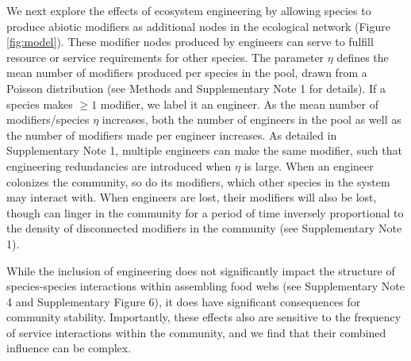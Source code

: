 \documentclass[twocolumn,preprintnumbers,amsmath,amssymb,superscriptaddress,linenumbers]{revtex4-1}
\begin{document}
We next explore the effects of ecosystem engineering by allowing species to produce abiotic modifiers as additional nodes in the ecological network (Figure \ref{fig:model}).
These modifier nodes produced by engineers can serve to fulfill resource or service requirements for other species.
The parameter $\eta$ defines the mean number of modifiers produced per species in the pool, drawn from a Poisson distribution (see Methods and Supplementary Note 1 for details).
If a species makes $\geq 1$ modifier, we label it an engineer.
As the mean number of modifiers/species $\eta$ increases, both the number of engineers in the pool as well as the number of modifiers made per engineer increases.
As detailed in Supplementary Note 1, multiple engineers can make the same modifier, such that engineering redundancies are introduced when $\eta$ is large.
When an engineer colonizes the community, so do its modifiers, which other species in the system may interact with.
When engineers are lost, their modifiers will also be lost, though can linger in the community for a period of time inversely proportional to the density of disconnected modifiers in the community (see Supplementary Note 1).






While the inclusion of engineering does not significantly impact the structure of species-species interactions within assembling food webs (see Supplementary Note 4 and Supplementary Figure 6), it does have significant consequences for community stability. %
Importantly, these effects also are sensitive to the frequency of service interactions within the community, and we find that their combined influence can be complex.
\end{document}
